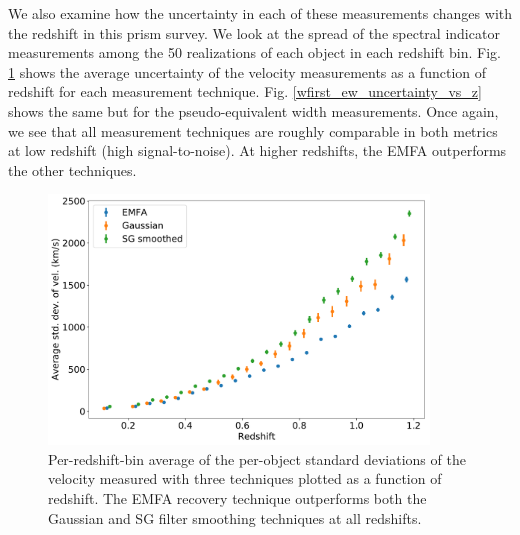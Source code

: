 We also examine how the uncertainty in each of these measurements changes with the redshift in this prism survey. We look at the spread of the spectral indicator measurements among the 50 realizations of each object in each redshift bin. Fig. \ref{wfirst_vel_uncertainty_vs_z} shows the average uncertainty of the velocity measurements as a function of redshift for each measurement technique. Fig. \ref{wfirst_ew_uncertainty_vs_z} shows the same but for the pseudo-equivalent width measurements. Once again, we see that all measurement techniques are roughly comparable in both metrics at low redshift (high signal-to-noise). At higher redshifts, the EMFA outperforms the other techniques.

\begin{figure}[htbp]
    \centering
    \includegraphics[width=0.9\textwidth]{figures/si_feat_pca/wfirst_vel_uncert.pdf}
    \caption{Per-redshift-bin average of the per-object standard deviations of the velocity measured with three techniques plotted as a function of redshift. The EMFA recovery technique outperforms both the Gaussian and SG filter smoothing techniques at all redshifts.}
    \label{wfirst_vel_uncertainty_vs_z}
\end{figure}

